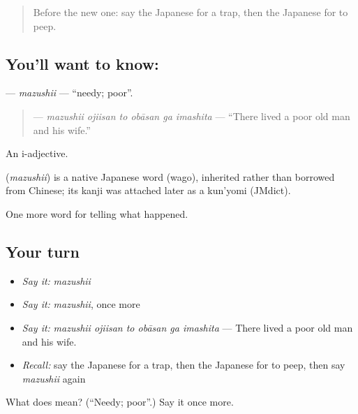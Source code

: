 \label{lesson:JA-C304-mazushii}



\begin{quote}
Before the new one: say the Japanese for a trap, then the Japanese for to peep.
\end{quote}

\subsection*{You'll want to know: }
\textbf{} — \emph{mazushii} — \textquotedblleft{}needy; poor\textquotedblright{}.

\begin{quote}
\textbf{   } — \emph{mazushii ojiisan to obāsan ga imashita} — \textquotedblleft{}There lived a poor old man and his wife.\textquotedblright{}
\end{quote}

An i-adjective.

\begin{cousinweb}
\textbf{} (\emph{mazushii}) is a native Japanese word (wago), inherited rather than borrowed from Chinese; its kanji was attached later as a kun'yomi (JMdict).
\end{cousinweb}

\begin{grammarlens}[title={What you've built}]
One more word for telling what happened.
\end{grammarlens}

\subsection*{Your turn}
\begin{itemize}
\raggedright
  \item \emph{Say it:} \emph{mazushii}
  \item \emph{Say it:} \emph{mazushii}, once more
  \item \emph{Say it:} \emph{mazushii ojiisan to obāsan ga imashita} — There lived a poor old man and his wife.
  \item \emph{Recall:} say the Japanese for a trap, then the Japanese for to peep, then say \emph{mazushii} again
\end{itemize}

\begin{tcolorbox}[breakable,colback=teal!4,colframe=teal!35!black,title={Before you move on}]
What does  mean? (\textquotedblleft{}Needy; poor\textquotedblright{}.) Say it once more.
\end{tcolorbox}
